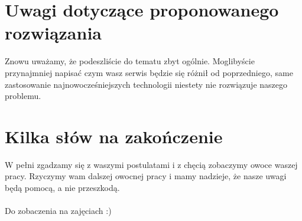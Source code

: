 \documentclass[10pt,a4paper]{article}
\begin{document}
\section{Uwagi dotyczące proponowanego rozwiązania}
Znowu uważamy, że podeszliście do tematu zbyt ogólnie. Moglibyście przynajmniej napisać czym wasz serwis będzie się różnił od poprzedniego, same zastosowanie najnowocześniejszych technologii niestety nie rozwiązuje naszego problemu.
\section{Kilka słów na zakończenie}
W pełni zgadzamy się z waszymi postulatami i z chęcią zobaczymy owoce waszej pracy. Rzyczymy wam dalszej owocnej pracy i mamy nadzieje, że nasze uwagi będą pomocą, a nie przeszkodą.\\ \\ Do zobaczenia na zajęciach :)
\end{document}
